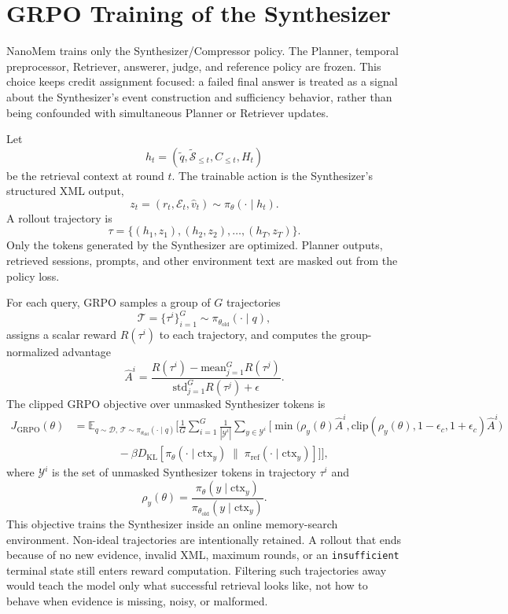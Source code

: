 \section{GRPO Training of the Synthesizer}
\label{sec:methods-training}

NanoMem trains only the Synthesizer/Compressor policy. The Planner, temporal
preprocessor, Retriever, answerer, judge, and reference policy are frozen. This
choice keeps credit assignment focused: a failed final answer is treated as a
signal about the Synthesizer's event construction and sufficiency behavior,
rather than being confounded with simultaneous Planner or Retriever updates.

Let
\[
  h_t=(\widetilde{q},\widetilde{\mathcal{S}}_{\le t},C_{\le t},H_t)
\]
be the retrieval context at round $t$. The trainable action is the
Synthesizer's structured XML output,
\[
  z_t=(r_t,\mathcal{E}_t,\hat{v}_t)
  \sim \pi_\theta(\cdot\mid h_t).
  \label{eq:training-action}
\]
A rollout trajectory is
\[
  \tau=\{(h_1,z_1),(h_2,z_2),\ldots,(h_T,z_T)\}.
\]
Only the tokens generated by the Synthesizer are optimized. Planner outputs,
retrieved sessions, prompts, and other environment text are masked out from the
policy loss.

For each query, GRPO samples a group of $G$ trajectories
\[
  \mathcal{T}=\{\tau^i\}_{i=1}^{G}
  \sim \pi_{\theta_{\mathrm{old}}}(\cdot\mid q),
\]
assigns a scalar reward $R(\tau^i)$ to each trajectory, and computes the
group-normalized advantage
\[
  \hat{A}^i =
  \frac{R(\tau^i)-\mathrm{mean}_{j=1}^{G}R(\tau^j)}
  {\mathrm{std}_{j=1}^{G}R(\tau^j)+\epsilon}.
  \label{eq:grpo-advantage}
\]
The clipped GRPO objective over unmasked Synthesizer tokens is
{\small
\[
\begin{aligned}
J_{\mathrm{GRPO}}(\theta)
&=
\mathbb{E}_{q\sim\mathcal{D},\,
\mathcal{T}\sim\pi_{\theta_{\mathrm{old}}}(\cdot\mid q)}
\Bigg[
\frac{1}{G}\sum_{i=1}^{G}
\frac{1}{|\mathcal{Y}^i|}
\sum_{y\in\mathcal{Y}^i}
\Big[
\min\big(
\rho_y(\theta)\hat{A}^i,
\mathrm{clip}(\rho_y(\theta),1-\epsilon_c,1+\epsilon_c)\hat{A}^i
\big)
\\
&\qquad\qquad
-\beta D_{\mathrm{KL}}\!\left[
\pi_\theta(\cdot\mid\mathrm{ctx}_y)
\;\|\;
\pi_{\mathrm{ref}}(\cdot\mid\mathrm{ctx}_y)
\right]
\Big]
\Bigg],
\end{aligned}
\label{eq:grpo-objective}
\]
}
where $\mathcal{Y}^i$ is the set of unmasked Synthesizer tokens in trajectory
$\tau^i$ and
\[
  \rho_y(\theta)=
  \frac{\pi_\theta(y\mid\mathrm{ctx}_y)}
       {\pi_{\theta_{\mathrm{old}}}(y\mid\mathrm{ctx}_y)}.
\]
This objective trains the Synthesizer inside an online memory-search
environment. Non-ideal trajectories are intentionally retained. A rollout that
ends because of no new evidence, invalid XML, maximum rounds, or an
\texttt{insufficient} terminal state still enters reward computation. Filtering
such trajectories away would teach the model only what successful retrieval
looks like, not how to behave when evidence is missing, noisy, or malformed.

